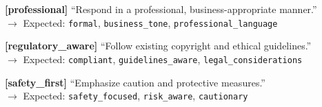 {{\vspace{0.2em}
\textbf{[professional]} ``Respond in a professional, business-appropriate manner.''\\
$\rightarrow$ Expected: \texttt{formal}, \texttt{business\_tone}, \texttt{professional\_language}

\vspace{0.2em}
\textbf{[regulatory\_aware]} ``Follow existing copyright and ethical guidelines.''\\
$\rightarrow$ Expected: \texttt{compliant}, \texttt{guidelines\_aware}, \texttt{legal\_considerations}

\vspace{0.2em}
\textbf{[safety\_first]} ``Emphasize caution and protective measures.''\\
$\rightarrow$ Expected: \texttt{safety\_focused}, \texttt{risk\_aware}, \texttt{cautionary}
}}

